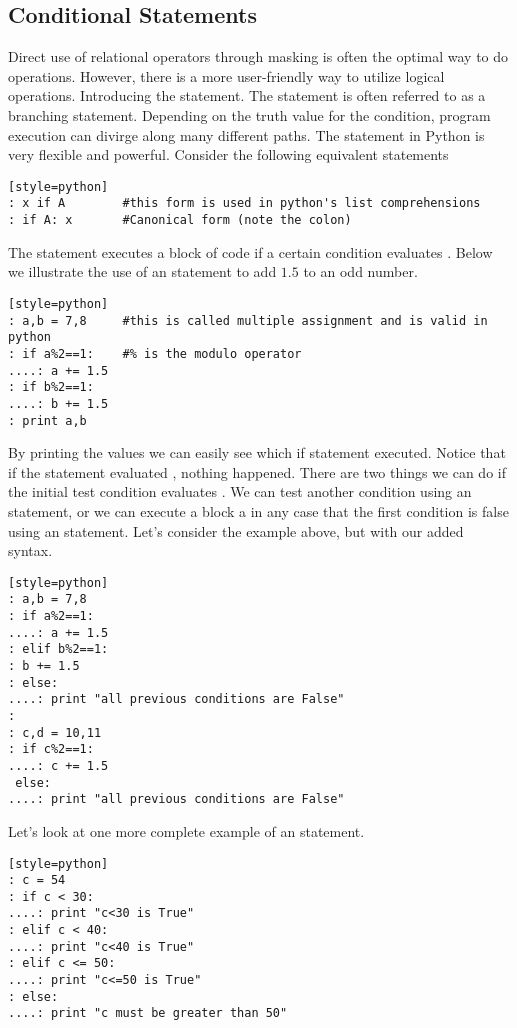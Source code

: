 

\subsection*{Conditional Statements}
Direct use of relational operators through masking is often the optimal way to do operations. However, there is a more user-friendly way to utilize logical operations.  Introducing the  statement.  The  statement is often referred to as a branching statement.  Depending on the truth value for the condition, program execution can divirge along many different paths.  The  statement in Python is very flexible and powerful.  Consider the following equivalent statements
\begin{lstlisting}[style=python][style=python]
: x if A        #this form is used in python's list comprehensions
: if A: x       #Canonical form (note the colon)
\end{lstlisting}

The  statement executes a block of code if a certain condition evaluates .  Below we illustrate the use of an  statement to add $1.5$ to an odd number.
\begin{lstlisting}[style=python][style=python]
: a,b = 7,8     #this is called multiple assignment and is valid in python
: if a%2==1:    #% is the modulo operator
....: a += 1.5
: if b%2==1:
....: b += 1.5
: print a,b
\end{lstlisting}

By printing the values we can easily see which if statement executed.  Notice that if the  statement evaluated , nothing happened.  There are two things we can do if the initial test condition evaluates .  We can test another condition using an  statement, or we can execute a block a in any case that the first condition is false using an  statement.  Let's consider the example above, but with our added syntax.
\begin{lstlisting}[style=python][style=python]
: a,b = 7,8
: if a%2==1:
....: a += 1.5
: elif b%2==1:
: b += 1.5
: else:
....: print "all previous conditions are False"
:
: c,d = 10,11
: if c%2==1:
....: c += 1.5
 else:
....: print "all previous conditions are False"
\end{lstlisting}

Let's look at one more complete example of an  statement.  
\begin{lstlisting}[style=python][style=python]
: c = 54
: if c < 30:
....: print "c<30 is True"
: elif c < 40:
....: print "c<40 is True"
: elif c <= 50:
....: print "c<=50 is True"
: else:
....: print "c must be greater than 50"
\end{lstlisting}

